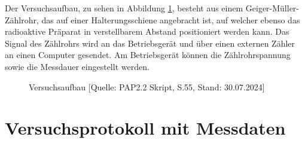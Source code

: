 \documentclass{article}
\begin{document}
Der Versuchsaufbau, zu sehen in Abbildung \ref{fig:aufbau}, besteht aus einem Geiger-Müller-Zählrohr, das auf einer Halterungsschiene angebracht ist, auf welcher ebenso das radioaktive Präparat in verstellbarem Abstand positioniert werden kann. Das Signal des Zählrohrs wird an das Betriebsgerät und über einen externen Zähler an einen Computer gesendet. Am Betriebsgerät können die Zählrohrspannung sowie die Messdauer eingestellt werden.  



\begin{figure}[!b]
    \centering
    \caption{Versuchsaufbau [Quelle: PAP2.2 Skript, S.55, Stand: 30.07.2024]}
    \label{fig:aufbau}
\end{figure}


\phantom{.}





\newpage

\section{Versuchsprotokoll mit Messdaten}
\end{document}
